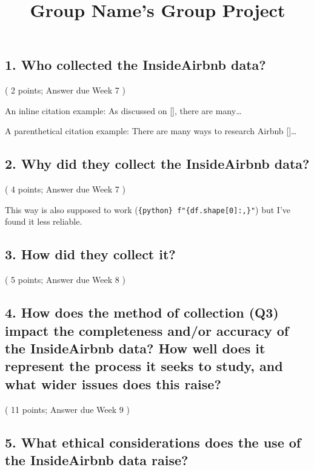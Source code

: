\documentclass[
  a4paper,
  DIV=11,
  numbers=noendperiod]{scrartcl}
\title{Group Name's Group Project}
\author{}
\date{}
\begin{document}
\maketitle


\subsection{1. Who collected the InsideAirbnb
data?}\label{who-collected-the-insideairbnb-data}

( 2 points; Answer due Week 7 )

An inline citation example: As discussed on {[}{]}, there are
many\ldots{}

A parenthetical citation example: There are many ways to research Airbnb
{[}{]}\ldots{}

\subsection{2. Why did they collect the InsideAirbnb
data?}\label{why-did-they-collect-the-insideairbnb-data}

( 4 points; Answer due Week 7 )

This way is also supposed to work
(\texttt{\{python\}\ f"\{df.shape{[}0{]}:,\}"}) but I've found it less
reliable.

\subsection{3. How did they collect it?}\label{how-did-they-collect-it}

( 5 points; Answer due Week 8 )

\subsection{4. How does the method of collection (Q3) impact the
completeness and/or accuracy of the InsideAirbnb data? How well does it
represent the process it seeks to study, and what wider issues does this
raise?}\label{how-does-the-method-of-collection-q3-impact-the-completeness-andor-accuracy-of-the-insideairbnb-data-how-well-does-it-represent-the-process-it-seeks-to-study-and-what-wider-issues-does-this-raise}

( 11 points; Answer due Week 9 )

\subsection{5. What ethical considerations does the use of the
InsideAirbnb data
raise?}\label{what-ethical-considerations-does-the-use-of-the-insideairbnb-data-raise}
\end{document}
